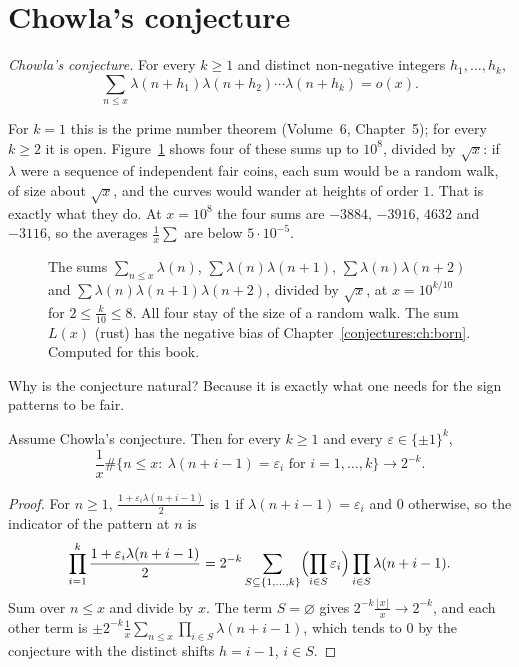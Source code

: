 \section{Chowla's conjecture}

\begin{center}
\emph{Chowla's conjecture.} For every $k\ge1$ and distinct non-negative integers $h_1,\dots,h_k$,
\[
\sum_{n\le x}\lambda(n+h_1)\lambda(n+h_2)\cdots\lambda(n+h_k)=o(x).
\]
\end{center}

For $k=1$ this is the prime number theorem (Volume~6, Chapter~5); for every $k\ge2$ it is open. Figure~\ref{conjectures:fig:chowla} shows four of these sums up to $10^8$,
divided by $\sqrt x$: if $\lambda$ were a sequence of independent fair coins, each sum would be a random walk, of size about $\sqrt x$, and the curves
would wander at heights of order $1$. That is exactly what they do. At $x=10^8$ the four sums are $-3884$, $-3916$, $4632$ and $-3116$, so the averages
$\frac1x\sum$ are below $5\cdot10^{-5}$.

\begin{figure}[ht]
\centering
{}
\caption{The sums $\sum_{n\le x}\lambda(n)$, $\sum\lambda(n)\lambda(n+1)$, $\sum\lambda(n)\lambda(n+2)$ and $\sum\lambda(n)\lambda(n+1)\lambda(n+2)$,
divided by $\sqrt x$, at $x=10^{k/10}$ for $2\le\frac k{10}\le8$. All four stay of the size of a random walk. The sum $L(x)$ (rust) has the negative bias of
Chapter~\ref{conjectures:ch:born}. Computed for this book.}
\label{conjectures:fig:chowla}
\end{figure}

Why is the conjecture natural? Because it is exactly what one needs for the sign patterns to be fair.

\begin{proposition}\label{conjectures:prop:patterns}
Assume Chowla's conjecture. Then for every $k\ge1$ and every $\varepsilon\in\{\pm1\}^k$,
\[
\frac1x\#\bigl\{n\le x:\ \lambda(n+i-1)=\varepsilon_i\text{ for }i=1,\dots,k\bigr\}\longrightarrow2^{-k}.
\]
\end{proposition}
\begin{proof}
For $n\ge1$, $\frac{1+\varepsilon_i\lambda(n+i-1)}2$ is $1$ if $\lambda(n+i-1)=\varepsilon_i$ and $0$ otherwise, so the indicator of the pattern at $n$ is
\[
\prod_{i=1}^k\frac{1+\varepsilon_i\lambda(n+i-1)}2=2^{-k}\sum_{S\subseteq\{1,\dots,k\}}\Bigl(\prod_{i\in S}\varepsilon_i\Bigr)\prod_{i\in S}\lambda(n+i-1).
\]
Sum over $n\le x$ and divide by $x$. The term $S=\varnothing$ gives $2^{-k}\frac{\lfloor x\rfloor}x\to2^{-k}$, and each other term is $\pm2^{-k}\frac1x\sum_{n\le x}\prod_{i\in S}\lambda(n+i-1)$,
which tends to $0$ by the conjecture with the distinct shifts $h=i-1$, $i\in S$.
\end{proof}

